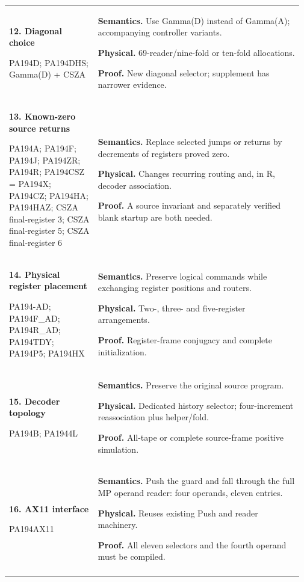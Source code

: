 \begin{longtable}{@{}>{\raggedright\arraybackslash}p{0.295\linewidth}>{\raggedright\arraybackslash}p{0.675\linewidth}@{}}
\textbf{12. Diagonal choice}\par PA194D; PA194DHS; Gamma(D) + CSZA & \textbf{Semantics.} Use Gamma(D) instead of Gamma(A); accompanying controller variants.\par\textbf{Physical.} 69-reader/nine-fold or ten-fold allocations.\par\textbf{Proof.} New diagonal selector; supplement has narrower evidence.\\\addlinespace[6pt]
\textbf{13. Known-zero source returns}\par PA194A; PA194F; PA194J; PA194ZR; PA194R; PA194CSZ = PA194X; PA194CZ; PA194HA; PA194HAZ; CSZA final-register 3; CSZA final-register 5; CSZA final-register 6 & \textbf{Semantics.} Replace selected jumps or returns by decrements of registers proved zero.\par\textbf{Physical.} Changes recurring routing and, in R, decoder association.\par\textbf{Proof.} A source invariant and separately verified blank startup are both needed.\\\addlinespace[6pt]
\textbf{14. Physical register placement}\par PA194-AD; PA194F\_\allowbreak{}AD; PA194R\_\allowbreak{}AD; PA194TDY; PA194P5; PA194HX & \textbf{Semantics.} Preserve logical commands while exchanging register positions and routers.\par\textbf{Physical.} Two-, three- and five-register arrangements.\par\textbf{Proof.} Register-frame conjugacy and complete initialization.\\\addlinespace[6pt]
\textbf{15. Decoder topology}\par PA194B; PA1944L & \textbf{Semantics.} Preserve the original source program.\par\textbf{Physical.} Dedicated history selector; four-increment reassociation plus helper/fold.\par\textbf{Proof.} All-tape or complete source-frame positive simulation.\\\addlinespace[6pt]
\textbf{16. AX11 interface}\par PA194AX11 & \textbf{Semantics.} Push the guard and fall through the full MP operand reader: four operands, eleven entries.\par\textbf{Physical.} Reuses existing Push and reader machinery.\par\textbf{Proof.} All eleven selectors and the fourth operand must be compiled.\\\addlinespace[6pt]

\end{longtable}
